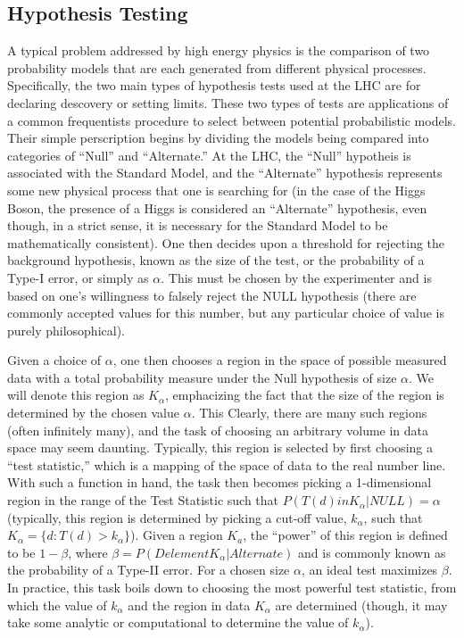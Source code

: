 \subsection{Hypothesis Testing}
A typical problem addressed by high energy physics is the comparison of two probability models that are each generated from different physical processes.
Specifically, the two main types of hypothesis tests used at the LHC are for declaring descovery or setting limits.
These two types of tests are applications of a common frequentists procedure to select between potential probabilistic models.
Their simple perscription begins by dividing the models being compared into categories of ``Null'' and ``Alternate.'' 
At the LHC, the ``Null'' hypotheis is associated with the Standard Model, and the ``Alternate'' hypothesis represents some new physical process that one is searching for (in the case of the Higgs Boson, the presence of a Higgs is considered an ``Alternate'' hypothesis, even though, in a strict sense, it is necessary for the Standard Model to be mathematically consistent).
One then decides upon a threshold for rejecting the background hypothesis, known as the size of the test, or the probability of a Type-I error, or simply as $\alpha$.
This must be chosen by the experimenter and is based on one's willingness to falsely reject the NULL hypothesis (there are commonly accepted values for this number, but any particular choice of value is purely philosophical).

Given a choice of $\alpha$, one then chooses a region in the space of possible measured data with a total probability measure under the Null hypothesis of size $\alpha$.
We will denote this region as $K_{\alpha}$, emphacizing the fact that the size of the region is determined by the chosen value $\alpha$.
This 
Clearly, there are many such regions (often infinitely many), and the task of choosing an arbitrary volume in data space may seem daunting.
Typically, this region is selected by first choosing a ``test statistic,'' which is a mapping of the space of data to the real number line.
With such a function in hand, the task then becomes picking a 1-dimensional region in the range of the Test Statistic such that $ P( T(d) in K_{ \alpha } | NULL) = \alpha$ (typically, this region is determined by picking a cut-off value, $k_{\alpha}$, such that $K_{\alpha} = \{d : T(d) > k_{\alpha} \}$).
Given a region $K_{a}$, the ``power'' of this region is defined to be $1 - \beta$, where $\beta = P(D element K_{ \alpha } | Alternate)$ and is commonly known as the probability of a Type-II error.
For a chosen size $\alpha$, an ideal test maximizes $\beta$.
In practice, this task boils down to choosing the most powerful test statistic, from which the value of $k_{\alpha}$ and the region in data $K_{\alpha}$ are determined (though, it may take some analytic or computational to determine the value of $k_{\alpha}$).

